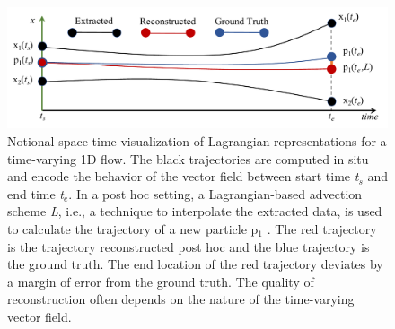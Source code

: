 %
%
%
%

\begin{figure}[!t]
\centering
\includegraphics[width=0.9\linewidth]{Images/sample.pdf}
\vspace{-4mm}
\caption{Notional space-time visualization of Lagrangian representations for a time-varying 1D flow. The black trajectories are computed in situ and encode the behavior of the vector field between start time \textit{t$_{s}$} and end time \textit{t$_{e}$}. In a post hoc setting, a Lagrangian-based advection scheme \textit{L}, i.e., a technique to interpolate the extracted data, is used to calculate the trajectory of a new particle p$_{1}$ . The red trajectory is the trajectory reconstructed post hoc and the blue trajectory is the ground truth. The end location of the red trajectory deviates by a margin of error from the ground truth. The quality of reconstruction often depends on the nature of the time-varying vector field.}
\vspace{-5mm}
\label{fig:sample}
\end{figure}


